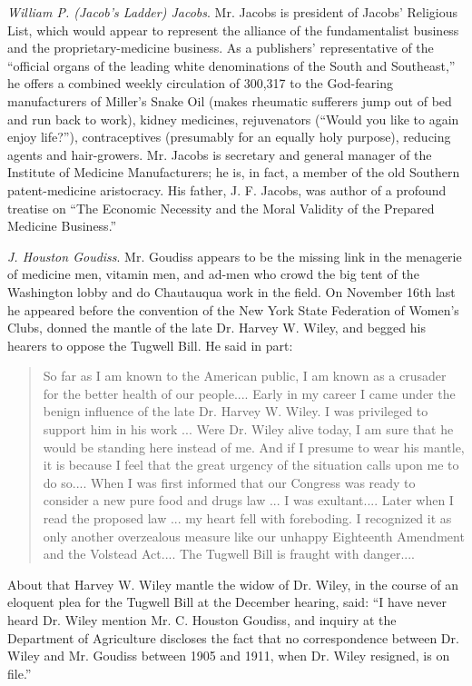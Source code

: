 \documentclass[twoside,nohyper,openany,nobib]{tufte-book}
\begin{document}
\emph{William P. (Jacob's Ladder) Jacobs}. Mr. Jacobs is president of
Jacobs' Religious List, which would appear to represent the alliance of
the fundamentalist business and the proprietary-medicine business. As a
publishers' representative of the ``official organs of the leading white
denominations of the South and Southeast,'' he offers a combined weekly
circulation of 300,317 to the God-fearing manufacturers of Miller's
Snake Oil (makes rheumatic sufferers jump out of bed and run back to
work), kidney medicines, rejuvenators (``Would you like to again enjoy
life?''), contraceptives (presumably for an equally holy purpose),
reducing agents and hair-growers. Mr. Jacobs is secretary and general
manager of the Institute of Medicine Manufacturers; he is, in fact, a
member of the old Southern patent-medicine aristocracy. His father, J.
F. Jacobs, was author of a profound treatise on ``The Economic Necessity
and the Moral Validity of the Prepared Medicine Business.''

\emph{J. Houston Goudiss}. Mr. Goudiss appears to be the missing link in
the menagerie of medicine men, vitamin men, and ad-men who crowd the big
tent of the Washington lobby and do Chautauqua work in the field. On
November 16th last he appeared before the convention of the New York
State Federation of Women's Clubs, donned the mantle of the late Dr.
Harvey W. Wiley, and begged his hearers to oppose the Tugwell Bill. He
said in part:

\begin{quote}
So far as I am known to the American public, I am known as a crusader
for the better health of our people.... Early in my career I came under
the benign influence of the late Dr. Harvey W. Wiley. I was privileged
to support him in his work ... Were Dr. Wiley alive today, I am sure
that he would be standing here instead of me. And if I presume to wear
his mantle, it is because I feel that the great urgency of the situation
calls upon me to do so.... When I was first informed that our Congress
was ready to consider a new pure food and drugs law ... I was
exultant.... Later when I read the proposed law ... my heart fell with
foreboding. I recognized it as only another overzealous measure like our
unhappy Eighteenth Amendment and the Volstead Act.... The Tugwell Bill
is fraught with danger....
\end{quote}

About that Harvey W. Wiley mantle the widow of Dr. Wiley, in the course
of an eloquent plea for the Tugwell Bill at the December hearing, said:
``I have never heard Dr. Wiley mention Mr. C. Houston Goudiss, and
inquiry at the Department of Agriculture discloses the fact that no
correspondence between Dr. Wiley and Mr. Goudiss between 1905 and 1911,
when Dr. Wiley resigned, is on file.''
\end{document}
